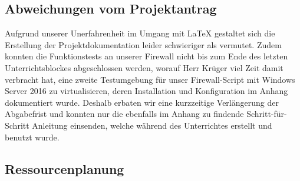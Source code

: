 \subsection{Abweichungen vom Projektantrag}
\label{sec:AbweichungenProjektantrag}

    Aufgrund unserer Unerfahrenheit im Umgang mit \LaTeX{} gestaltet sich die Erstellung der Projektdokumentation leider schwieriger als vermutet. Zudem konnten die Funktionstests an unserer Firewall nicht bis zum Ende des letzten Unterrichtsblockes abgeschlossen werden, worauf Herr Krüger viel Zeit damit verbracht hat, eine zweite Testumgebung für unser Firewall-Script mit Windows Server 2016 zu virtualisieren, deren Installation und Konfiguration im Anhang dokumentiert wurde. Deshalb erbaten wir  eine kurzzeitige Verlängerung der Abgabefrist und konnten nur die ebenfalls im Anhang zu findende Schritt-für-Schritt Anleitung einsenden, welche während des Unterrichtes erstellt und benutzt wurde.

\subsection{Ressourcenplanung}
\label{sec:Ressourcenplanung}

